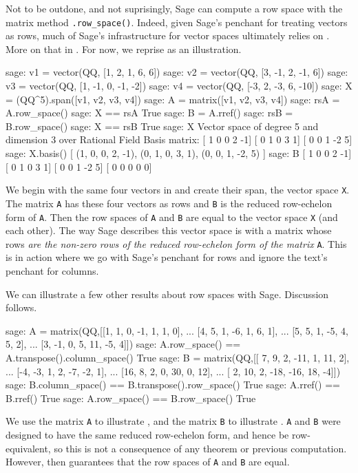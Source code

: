 Not to be outdone, and not suprisingly, Sage can compute a row space with the matrix method \verb?.row_space()?.  Indeed, given Sage's penchant for treating vectors as rows, much of Sage's infrastructure for vector spaces ultimately relies on .  More on that in .  For now, we reprise  as an illustration.
%
\begin{sageexample}
sage: v1 = vector(QQ, [1,  2,  1,  6,   6])
sage: v2 = vector(QQ, [3, -1,  2, -1,   6])
sage: v3 = vector(QQ, [1, -1,  0, -1,  -2])
sage: v4 = vector(QQ, [-3, 2, -3,  6, -10])
sage: X = (QQ^5).span([v1, v2, v3, v4])
sage: A = matrix([v1, v2, v3, v4])
sage: rsA = A.row_space()
sage: X == rsA
True
sage: B = A.rref()
sage: rsB = B.row_space()
sage: X == rsB
True
sage: X
Vector space of degree 5 and dimension 3 over Rational Field
Basis matrix:
[ 1  0  0  2 -1]
[ 0  1  0  3  1]
[ 0  0  1 -2  5]
sage: X.basis()
[
(1, 0, 0, 2, -1),
(0, 1, 0, 3, 1),
(0, 0, 1, -2, 5)
]
sage: B
[ 1  0  0  2 -1]
[ 0  1  0  3  1]
[ 0  0  1 -2  5]
[ 0  0  0  0  0]
\end{sageexample}
%
We begin with the same four vectors in  and create their span, the vector space \verb?X?.  The matrix \verb?A? has these four vectors as rows and \verb?B? is the reduced row-echelon form of \verb?A?.  Then the row spaces of \verb?A? and \verb?B? are equal to the vector space \verb?X? (and each other).  The way Sage describes this vector space is with a matrix whose rows \emph{are the non-zero rows of the reduced row-echelon form of the matrix} \verb?A?.  This is  in action where we go with Sage's penchant for rows and ignore the text's penchant for columns.\par
%
We can illustrate a few other results about row spaces with Sage.  Discussion follows.
%
\begin{sageexample}
sage: A = matrix(QQ,[[1,  1, 0, -1,  1,  1, 0],
...                  [4,  5, 1, -6,  1,  6, 1],
...                  [5,  5, 1, -5,  4,  5, 2],
...                  [3, -1, 0,  5, 11, -5, 4]])
sage: A.row_space() == A.transpose().column_space()
True
sage: B = matrix(QQ,[[ 7,  9, 2, -11,   1, 11,  2],
...                  [-4, -3, 1,   2,  -7, -2,  1],
...                  [16,  8, 2,   0,  30,  0, 12],
...                  [ 2, 10, 2, -18, -16, 18, -4]])
sage: B.column_space() == B.transpose().row_space()
True
sage: A.rref() == B.rref()
True
sage: A.row_space() == B.row_space()
True
\end{sageexample}
%
We use the matrix \verb?A? to illustrate , and the matrix \verb?B? to illustrate .  \verb?A? and \verb?B? were designed to have the same reduced row-echelon form, and hence be row-equivalent, so this is not a consequence of any theorem or previous computation.  However, then  guarantees that the row spaces of \verb?A? and \verb?B? are equal.
%
\begin{sageverbatim}
\end{sageverbatim}
%
